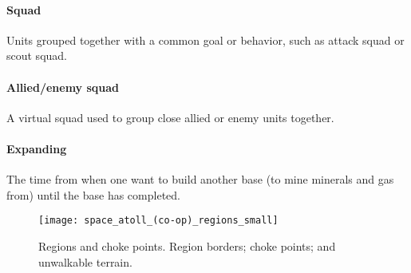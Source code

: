 \paragraph{Squad} Units grouped together with a common goal or behavior, such as attack squad or scout squad.
\paragraph{Allied/enemy squad} A virtual squad used to group close allied or enemy units together.
\paragraph{Expanding} The time from when one want to build another base (to mine minerals and gas from) until the base has completed.

\begin{figure}[htb]
	\centering
	\texttt{[image: space\_atoll\_(co-op)\_regions\_small]}
	\caption[Regions and choke points]{
		Regions and choke points.
		\usebox{\LegendLineLightGreen} Region borders;
		\usebox{\LegendLineRed} choke points; and
		\usebox{\LegendBoxYellow} unwalkable terrain.}
	\label{fig:region_and_choke_points}
\end{figure}
